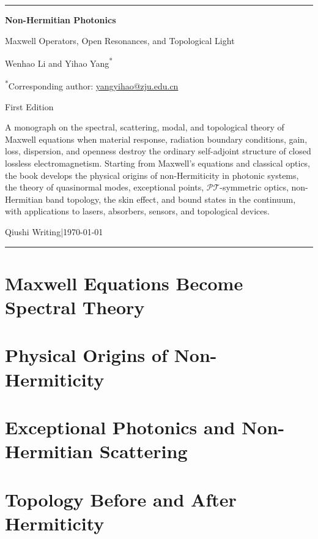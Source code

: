 \documentclass[11pt,a4paper,openany]{book}
\makeatletter
\newcommand{\BookTitle}{Non-Hermitian Photonics}
\newcommand{\BookSubtitle}{Maxwell Operators, Open Resonances, and Topological Light}
\newcommand{\BookAuthor}{Wenhao Li and Yihao Yang\textsuperscript{*}}
\newcommand{\BookCorrespondingAuthor}{\textsuperscript{*}Corresponding author: \href{mailto:yangyihao@zju.edu.cn}{yangyihao@zju.edu.cn}}
\newcommand{\BookPublisher}{Qiushi Writing}
\newcommand{\BookEdition}{First Edition}
\newcommand{\BookDate}{\today}
\newcommand{\BookDescription}{%
A monograph on the spectral, scattering, modal, and topological theory
of Maxwell equations when material response, radiation boundary conditions,
gain, loss, dispersion, and openness destroy the ordinary self-adjoint structure
of closed lossless electromagnetism.  Starting from Maxwell's equations and
classical optics, the book develops the physical origins of non-Hermiticity
in photonic systems, the theory of quasinormal modes, exceptional points,
$\mathcal{PT}$-symmetric optics, non-Hermitian band topology, the skin effect,
and bound states in the continuum, with applications to lasers, absorbers,
sensors, and topological devices.}
\theoremstyle{bookplain}
\theoremstyle{bookdefinition}
\theoremstyle{remark}
\newcommand{\MakeBookTitle}{
\begin{titlepage}
\centering
\vspace*{1.2cm}
{\color{BookAccent}\rule{\textwidth}{1.1pt}}\par
\vspace{2.0cm}
{\Huge\bfseries\color{BookBlue}\BookTitle\par}
\vspace{0.65cm}
{\Large\color{BookMuted}\BookSubtitle\par}
\vspace{1.7cm}
{\Large\BookAuthor\par}
\vspace{0.35cm}
{\small\color{BookMuted}\BookCorrespondingAuthor\par}
\vspace{0.45cm}
{\normalsize\BookEdition\par}
\vfill
\begin{minipage}{0.78\textwidth}
\centering
\small\color{BookMuted}\BookDescription
\end{minipage}
\vfill
{\small \BookPublisher\quad|\quad \BookDate\par}
\vspace{0.7cm}
{\color{BookAccent}\rule{0.55\textwidth}{0.8pt}}\par
\end{titlepage}
}
\makeatother
\begin{document}
\frontmatter
\MakeBookTitle
\tableofcontents

\mainmatter

\part{Maxwell Equations Become Spectral Theory}






\part{Physical Origins of Non-Hermiticity}





\part{Exceptional Photonics and Non-Hermitian Scattering}





\part{Topology Before and After Hermiticity}







\end{document}

